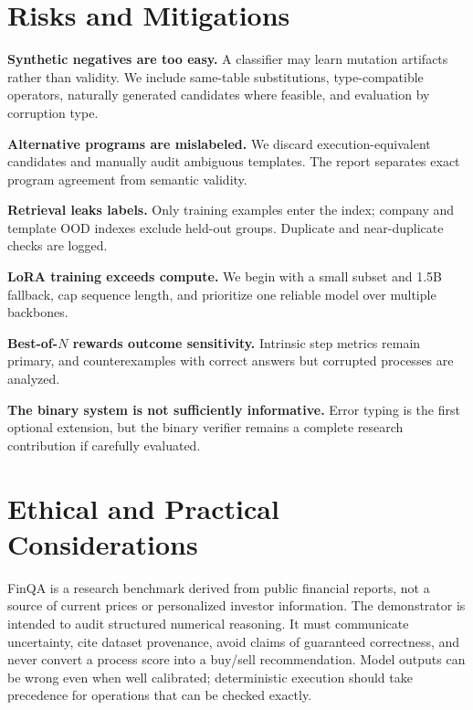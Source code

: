 \documentclass[10pt,twocolumn]{article}
\begin{document}
\section{Risks and Mitigations}
\textbf{Synthetic negatives are too easy.} A classifier may learn mutation artifacts rather than validity. We include same-table substitutions, type-compatible operators, naturally generated candidates where feasible, and evaluation by corruption type.

\textbf{Alternative programs are mislabeled.} We discard execution-equivalent candidates and manually audit ambiguous templates. The report separates exact program agreement from semantic validity.

\textbf{Retrieval leaks labels.} Only training examples enter the index; company and template OOD indexes exclude held-out groups. Duplicate and near-duplicate checks are logged.

\textbf{LoRA training exceeds compute.} We begin with a small subset and 1.5B fallback, cap sequence length, and prioritize one reliable model over multiple backbones.

\textbf{Best-of-$N$ rewards outcome sensitivity.} Intrinsic step metrics remain primary, and counterexamples with correct answers but corrupted processes are analyzed.

\textbf{The binary system is not sufficiently informative.} Error typing is the first optional extension, but the binary verifier remains a complete research contribution if carefully evaluated.

\section{Ethical and Practical Considerations}
FinQA is a research benchmark derived from public financial reports, not a source of current prices or personalized investor information. The demonstrator is intended to audit structured numerical reasoning. It must communicate uncertainty, cite dataset provenance, avoid claims of guaranteed correctness, and never convert a process score into a buy/sell recommendation. Model outputs can be wrong even when well calibrated; deterministic execution should take precedence for operations that can be checked exactly.
\end{document}

